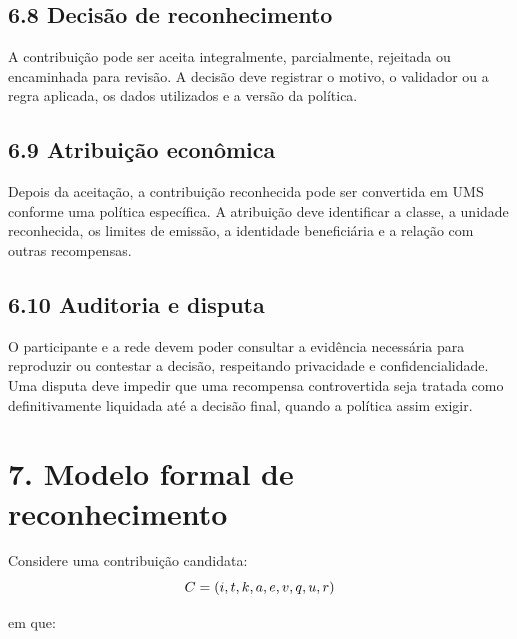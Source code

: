 \documentclass[12pt,a4paper]{article}
\begin{document}
\subsection{6.8 Decisão de reconhecimento}

A contribuição pode ser aceita integralmente, parcialmente, rejeitada ou encaminhada para revisão. A decisão deve registrar o motivo, o validador ou a regra aplicada, os dados utilizados e a versão da política.\\

\subsection{6.9 Atribuição econômica}

Depois da aceitação, a contribuição reconhecida pode ser convertida em UMS conforme uma política específica. A atribuição deve identificar a classe, a unidade reconhecida, os limites de emissão, a identidade beneficiária e a relação com outras recompensas.\\

\subsection{6.10 Auditoria e disputa}

O participante e a rede devem poder consultar a evidência necessária para reproduzir ou contestar a decisão, respeitando privacidade e confidencialidade. Uma disputa deve impedir que uma recompensa controvertida seja tratada como definitivamente liquidada até a decisão final, quando a política assim exigir.\\


\section{7. Modelo formal de reconhecimento}

Considere uma contribuição candidata:\\

\[
C = (i, t, k, a, e, v, q, u, r)\\
\]

em que:\\
\end{document}
